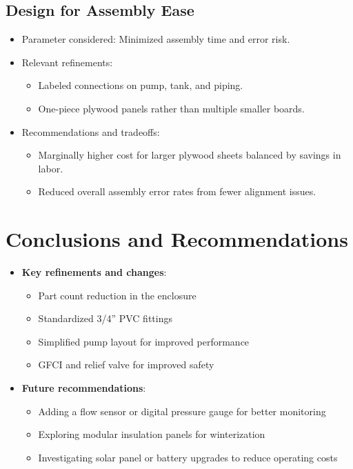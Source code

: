 \documentclass[12pt]{article}
\begin{document}
\begin{itemize}[leftmargin=1.5cm]
\subsection{Design for Assembly Ease}
\begin{itemize}[leftmargin=1.5cm]
    \item Parameter considered: Minimized assembly time and error risk.
    \item Relevant refinements:
    \begin{itemize}
        \item Labeled connections on pump, tank, and piping.
        \item One-piece plywood panels rather than multiple smaller boards.
    \end{itemize}
    \item Recommendations and tradeoffs:
    \begin{itemize}
        \item Marginally higher cost for larger plywood sheets balanced by savings in labor.
        \item Reduced overall assembly error rates from fewer alignment issues.
    \end{itemize}
\end{itemize}


\section{Conclusions and Recommendations}
\begin{itemize}[leftmargin=1.5cm]
    \item \textbf{Key refinements and changes}:
    \begin{itemize}
        \item Part count reduction in the enclosure
        \item Standardized 3/4'' PVC fittings
        \item Simplified pump layout for improved performance
        \item GFCI and relief valve for improved safety
    \end{itemize}

    \item \textbf{Future recommendations}:
    \begin{itemize}
        \item Adding a flow sensor or digital pressure gauge for better monitoring
        \item Exploring modular insulation panels for winterization
        \item Investigating solar panel or battery upgrades to reduce operating costs
    \end{itemize}


\end{itemize}
\end{itemize}
\end{document}
